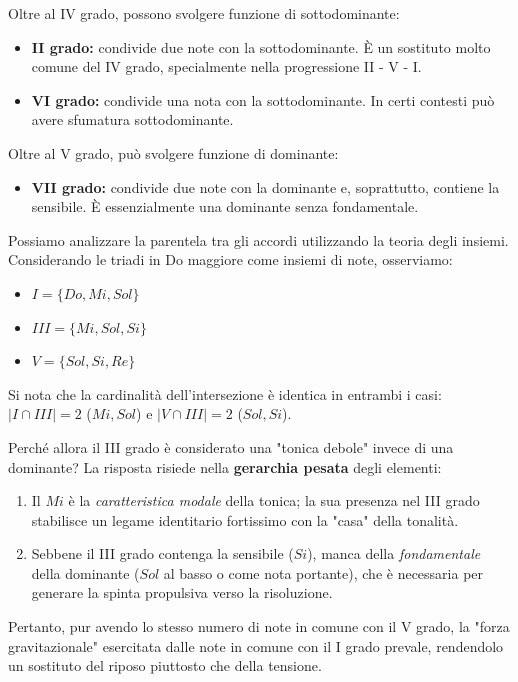 \begin{definizione}
	\label{def:accordi_sottodominante}
	Oltre al IV grado, possono svolgere funzione di sottodominante:
	\begin{itemize}
		\item \textbf{II grado:} condivide due note con la sottodominante. È un sostituto molto comune del IV grado, specialmente nella progressione II - V - I.
		\item \textbf{VI grado:} condivide una nota con la sottodominante. In certi contesti può avere sfumatura sottodominante.
	\end{itemize}
\end{definizione}


\begin{definizione}
	\label{def:accordi_dominante}
	Oltre al V grado, può svolgere funzione di dominante:
	\begin{itemize}
		\item \textbf{VII grado:} condivide due note con la dominante e, soprattutto, contiene la sensibile. È essenzialmente una dominante senza fondamentale.
	\end{itemize}
\end{definizione}

\begin{matematica}
	Possiamo analizzare la parentela tra gli accordi utilizzando la teoria degli insiemi. Considerando le triadi in Do maggiore come insiemi di note, osserviamo:
	\begin{itemize}
		\item $I = \{Do, Mi, Sol\}$
		\item $III = \{Mi, Sol, Si\}$
		\item $V = \{Sol, Si, Re\}$
	\end{itemize}
	Si nota che la cardinalità dell'intersezione è identica in entrambi i casi: 
	$|I \cap III| = 2$ ($Mi, Sol$) e $|V \cap III| = 2$ ($Sol, Si$). 
	
	Perché allora il III grado è considerato una "tonica debole"  invece di una dominante? La risposta risiede nella \textbf{gerarchia pesata} degli elementi:
	\begin{enumerate}
		\item Il $Mi$ è la \textit{caratteristica modale} della tonica; la sua presenza nel III grado stabilisce un legame identitario fortissimo con la "casa" della tonalità.
		\item Sebbene il III grado contenga la sensibile ($Si$), manca della \textit{fondamentale} della dominante ($Sol$ al basso o come nota portante), che è necessaria per generare la spinta propulsiva verso la risoluzione.
	\end{enumerate}
	Pertanto, pur avendo lo stesso numero di note in comune con il V grado, la "forza gravitazionale" esercitata dalle note in comune con il I grado prevale, rendendolo un sostituto del riposo piuttosto che della tensione.
\end{matematica}


